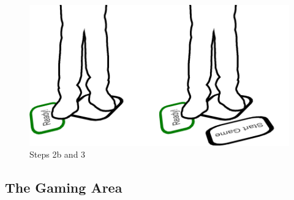 \documentclass{sigchi}
\begin{document}
\begin{figure}[H]
\centering
\includegraphics[width=0.9\columnwidth]{walkthrough/klein/beamingarea2b+3}
\caption{Steps 2b and 3}
\label{fig:gamingArea}
\end{figure}




\subsection{The Gaming Area}
\end{document}
